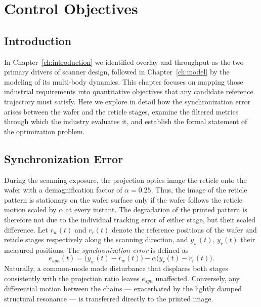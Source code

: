 \def\baselinestretch{1}

\chapter{Control Objectives}\label{ch:control_objectives}

\def\baselinestretch{1.66}

\section{Introduction}\label{sec:control_introduction}

In Chapter~\ref{ch:introduction} we identified overlay and throughput as the two primary drivers of scanner design, followed in Chapter~\ref{ch:model} by the modeling of its multi-body dynamics. This chapter focuses on mapping those industrial requirements into quantitative objectives that any candidate reference trajectory must satisfy. Here we explore in detail how the synchronization error arises between the wafer and the reticle stages, examine the filtered metrics through which the industry evaluates it, and establish the formal statement of the optimization problem.

\section{Synchronization Error}\label{sec:control_synchronization}

During the scanning exposure, the projection optics image the reticle onto the wafer with a demagnification factor of $\alpha = 0.25$. Thus, the image of the reticle pattern is stationary on the wafer surface only if the wafer follows the reticle motion scaled by $\alpha$ at every instant. The degradation of the printed pattern is therefore not due to the individual tracking error of either stage, but their scaled difference. Let $r_w(t)$ and $r_r(t)$ denote the reference positions of the wafer and reticle stages respectively along the scanning direction, and $y_w(t)$, $y_r(t)$ their measured positions. The \textit{synchronization error} is defined as~\cite{Butler2011_PositionControl}
\begin{equation}
    e_{syn}(t) = \big(y_w(t) - r_w(t)\big) - \alpha \big(y_r(t) - r_r(t)\big).
    \label{eq:esyn}
\end{equation}
Naturally, a common-mode mode disturbance that displaces both stages consistently with the projection ratio leaves $e_{syn}$ unaffected. Conversely, any differential motion between the chains --- exacerbated by the lightly damped structural resonance --- is transferred directly to the printed image.

